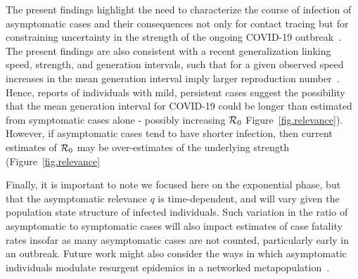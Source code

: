 The present findings highlight the need to characterize the course of infection of asymptomatic cases and their consequences not only for contact tracing but for constraining uncertainty in the strength of the ongoing COVID-19 outbreak~\citep{park_preprint}.
The present findings are also consistent with a recent generalization linking speed, strength, and generation intervals, such that for a given observed speed increases in the mean generation interval imply larger reproduction number~\citep{park_2019practical}. 
Hence, reports of individuals with mild, persistent cases suggest the possibility that the mean generation interval for COVID-19 could be longer than estimated from symptomatic cases alone - possibly increasing ${\cal{R}}_0$ \DIFdelbegin {}\DIFdelend \DIFaddbegin \DIFadd{(}\DIFaddend Figure~\ref{fig.relevance}\DIFdelbegin {}\DIFdelend \DIFaddbegin {}\DIFaddend ).
However, if asymptomatic cases tend to have shorter infection, then current estimates of ${\cal{R}}_0$ may be over-estimates of the underlying strength (\DIFdelbegin {}\DIFdelend Figure~\ref{fig.relevance}\DIFdelbegin {}\DIFdelend \DIFaddbegin {}

\DIFaddend Finally, it is important to note we focused here on the exponential phase, but that the asymptomatic relevance $q$ is time-dependent, and will vary given the population state structure of infected individuals. Such variation in the ratio of asymptomatic to symptomatic cases will also impact estimates of case fatality rates insofar as many asymptomatic cases are not counted, particularly early in an outbreak.
Future work might also consider the ways in which asymptomatic individuals modulate resurgent epidemics in a networked metapopulation~\citep{watts_pnas2005}.
\DIFdelbegin %

